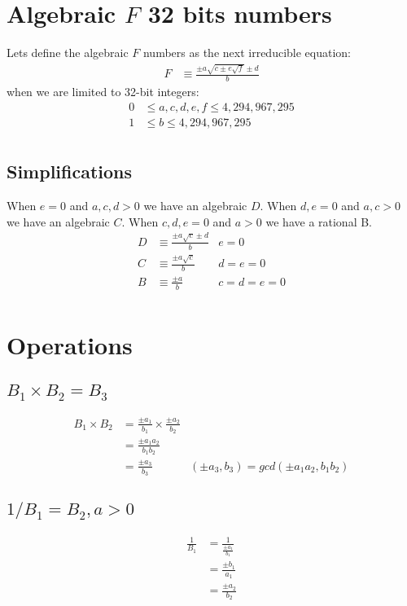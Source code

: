\documentclass{article}
\begin{document}
\section{Algebraic $F$ 32 bits numbers}
Lets define the algebraic $F$ numbers as the next irreducible equation:
\begin{align*}
F &\equiv \frac{\pm a\sqrt{c \pm e\sqrt{f}} \pm d }{b}
\end{align*}
when we are limited to 32-bit integers:
\begin{align*}
0 &\leq a, c, d, e, f \leq 4,294,967,295\\
1 &\leq b       \leq 4,294,967,295\\
\end{align*}

\subsection{Simplifications}
When $e = 0$ and $a,c,d > 0$ we have an algebraic $D$.
When $d,e = 0$ and $a,c > 0$ we have an algebraic $C$.
When $c,d,e = 0$ and $a > 0$ we have a rational B.
\begin{align*}
D &\equiv \frac{\pm a\sqrt{c} \pm d}{b} & e = 0\\
C &\equiv \frac{\pm a\sqrt{c}}{b}       & d = e = 0\\
B &\equiv \frac{\pm a}{b}               & c = d = e = 0\\
\end{align*}

\section{Operations}

\subsection{$B_1 \times B_2 = B_3$}
\begin{align*}
B_1 \times B_2 &= \frac{\pm a_1}{b_1} \times \frac{\pm a_2}{b_2} \\
  &= \frac{\pm a_1a_2}{b_1b_2} \\
  &= \frac{\pm a_3}{b_3} & (\pm a_3,b_3) = gcd(\pm a_1a_2, b_1b_2)
\end{align*}

\subsection{$1 / B_1 = B_2, a > 0$}
\begin{align*}
\frac{1}{B_1} &= \frac{1}{\frac{\pm a_1}{b_1}}\\
 &= \frac{\pm b_1}{a_1} \\
 &= \frac{\pm a_2}{b_2}
\end{align*}
\end{document}
